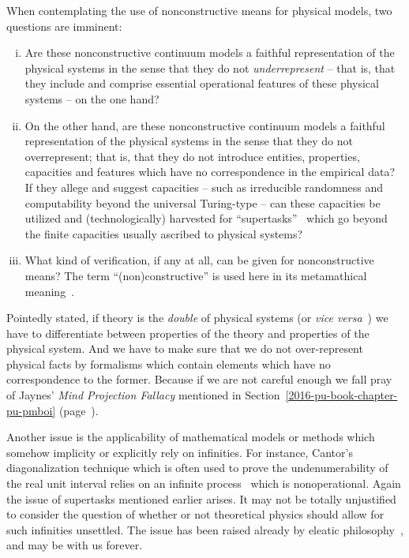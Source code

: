 When contemplating the use of nonconstructive means for physical models,
two questions are imminent:
\begin{enumerate}[(i)]
\item
Are these nonconstructive continuum models a faithful representation of the physical systems in the sense that
 they do not {\em underrepresent} --
that is, that they include and comprise essential operational features of these physical systems
-- on the one hand?


\item
On the other hand, are these nonconstructive continuum models a faithful representation of the physical systems in the sense that
they do not overrepresent;
that is,
that they do not introduce entities, properties, capacities and features which have no correspondence in the empirical data?
If they allege and suggest capacities -- such as irreducible randomness and computability beyond the universal Turing-type --
can these capacities be utilized and (technologically) harvested for ``supertasks''~\cite{thom:54,benna:62,en96,ear-nor:93,en96,sep-spacetime-supertasks}
which go beyond the finite capacities usually ascribed to physical systems?

\item
What kind of verification, if any at all, can be given for nonconstructive means?
The term ``(non)constructive'' is used here in its metamathical meaning~\cite{bridges-richman,mar2,bishop,bridges1}.

\end{enumerate}

Pointedly stated, if theory is the {\em double} of physical systems (or {\it vice versa}~\cite{Arthaud})
we have to differentiate between properties of the theory and properties of the physical system.
And we have to make sure that we do not over-represent physical facts by formalisms which contain elements which have no
correspondence to the former.
Because if we are not careful enough we fall pray of Jaynes' {\em Mind Projection Fallacy}
 mentioned in Section~\ref{2016-pu-book-chapter-pu-pmboi}
(page~\pageref{2016-pu-book-chapter-pu-pmboi}).


Another issue is the applicability of mathematical models or methods which somehow implicity or explicitly
rely on infinities.
For instance, Cantor's diagonalization technique which is often used
to prove the undenumerability of the real unit interval relies on an infinite process~\cite{bridgman} which is nonoperational.
Again the issue of supertasks mentioned earlier arises.
It may not be totally unjustified to consider the question of whether or not theoretical physics should  allow for such infinities unsettled.
The issue has been raised already by eleatic philosophy~\cite{gruenbaum:68,zeno,salmon-01},
and may be with us forever.


